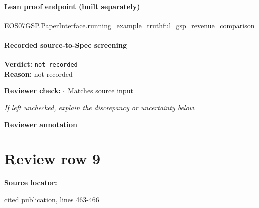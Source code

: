 \documentclass[10pt]{article}
\newcommand{\reviewerbox}{%
  \par\noindent\fbox{\parbox{0.96\linewidth}{\rule{0pt}{0.38in}}}\par
}
\newcommand{\reviewmatch}[1]{%
  \par\noindent\textbf{Reviewer check:} $\square$\; #1\par
  \noindent\emph{If left unchecked, explain the discrepancy or uncertainty below.}\par
}
\begin{document}
\paragraph{Lean proof endpoint (built separately)}\begin{ReviewVerbatim}
EOS07GSP.PaperInterface.running_example_truthful_gsp_revenue_comparison
\end{ReviewVerbatim}

\paragraph{Recorded source-to-Spec screening}
\textbf{Verdict:} \texttt{not recorded}
\\
\textbf{Reason:} not recorded
\reviewmatch{Matches source input}
\noindent\textbf{Reviewer annotation}\par
\reviewerbox
\clearpage
\hypertarget{source-claim-3508b3bd2381879e}{}
\section*{Review row 9}
\textbf{Source locator:} {\footnotesize\raggedright cited publication, lines 463-\allowbreak{}466\par}
\end{document}

